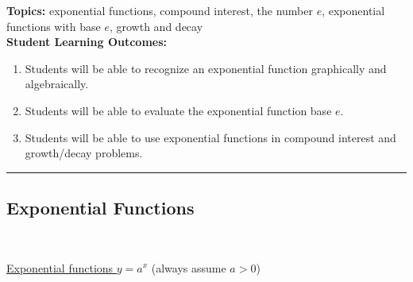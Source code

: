 

\noindent \textbf{Topics:}  exponential functions, compound interest, the number $e$, exponential functions with base $e$, growth and decay\\

\noindent \textbf{Student Learning Outcomes:}
\begin{enumerate}
\item Students will be able to recognize an exponential function graphically and algebraically.
\item Students will be able to evaluate the exponential function base $e$.
\item Students will be able to use exponential functions in compound interest and growth/decay problems.
\end{enumerate}

\hrule 

\bigskip

\subsection{Exponential Functions} ~

\noindent\underline{Exponential functions $y=a^x$} (always assume $a>0$) \\[.2in]

\clearpage

